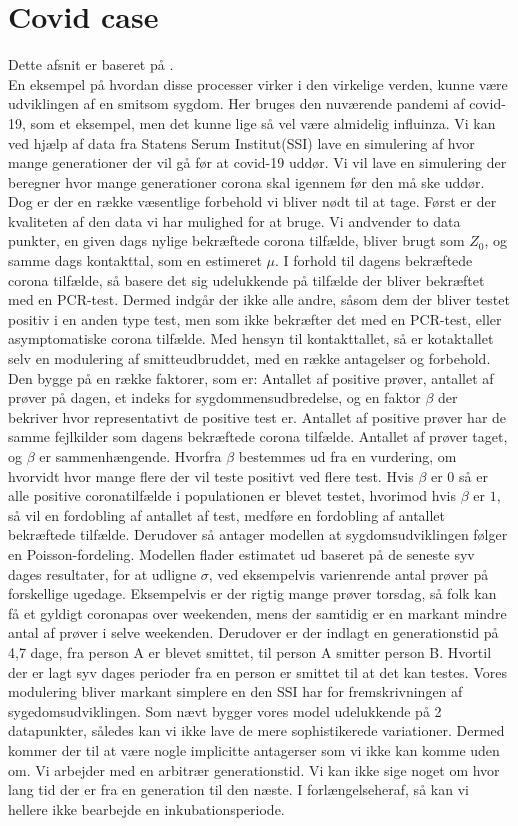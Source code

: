 \section {Covid case}
Dette afsnit er baseret på \cite{fremskrivning}.\\
En eksempel på hvordan  disse processer virker i den virkelige verden, kunne være udviklingen af en smitsom sygdom.
Her bruges den nuværende pandemi af covid-19, som et eksempel, men det kunne lige så vel være almidelig influinza.
Vi kan ved hjælp af data fra Statens Serum Institut(SSI) lave en simulering af hvor mange generationer der vil gå før at covid-19 uddør.
Vi vil lave en simulering der beregner hvor mange generationer corona skal igennem før den må ske uddør. 
Dog er der en række væsentlige forbehold vi bliver nødt til at tage. 
Først er der kvaliteten af den data vi har mulighed for at bruge.
Vi andvender to data punkter, en given dags nylige bekræftede corona tilfælde, bliver brugt som $Z_0$, og samme dags kontakttal, som en estimeret $\mu$.
I forhold til dagens bekræftede corona tilfælde, så basere det sig udelukkende på tilfælde der bliver bekræftet med en PCR-test. Dermed indgår der ikke alle andre, såsom dem der bliver testet positiv i en anden type test, men som ikke bekræfter det med en PCR-test, eller asymptomatiske corona tilfælde.
Med hensyn til kontakttallet, så er kotaktallet selv en modulering af smitteudbruddet, med en række antagelser og forbehold.
Den bygge på en række faktorer, som er: Antallet af positive prøver, antallet af prøver på dagen, et indeks for sygdommensudbredelse, og en faktor $\beta$ der bekriver hvor representativt de positive test er.
 Antallet af positive prøver har de samme fejlkilder som dagens bekræftede corona tilfælde.
 Antallet af prøver taget, og $\beta$ er sammenhængende. Hvorfra $\beta$ bestemmes ud fra en vurdering, om hvorvidt hvor mange flere der vil teste positivt ved flere test. Hvis $\beta$ er $0$ så er alle positive coronatilfælde i populationen er blevet testet, hvorimod hvis $\beta$ er $1$, så vil en fordobling af antallet af test, medføre en fordobling af antallet bekræftede tilfælde.
Derudover så antager modellen at sygdomsudviklingen følger en Poisson-fordeling.
Modellen flader estimatet ud baseret på de seneste syv dages resultater, for at udligne $\sigma$, ved eksempelvis varienrende antal prøver på forskellige ugedage. Eksempelvis er der rigtig mange prøver torsdag, så folk kan få et gyldigt coronapas over weekenden, mens der samtidig er en markant mindre antal af prøver i selve weekenden.
Derudover er der indlagt en generationstid på 4,7 dage, fra person A er blevet smittet, til person A smitter person B. Hvortil der er lagt syv dages perioder fra en person er smittet til at det kan testes.
Vores modulering bliver markant simplere en den SSI har for fremskrivningen af sygedomsudviklingen.
Som nævt bygger vores model udelukkende på 2 datapunkter, således kan vi ikke lave de mere sophistikerede variationer. 
Dermed kommer der til at være nogle implicitte antagerser som vi ikke kan komme uden om.
Vi arbejder med en arbitrær generationstid. Vi kan ikke sige noget om hvor lang tid der er fra en generation til den næste. I forlængelseheraf, så kan vi hellere ikke bearbejde en inkubationsperiode. 

